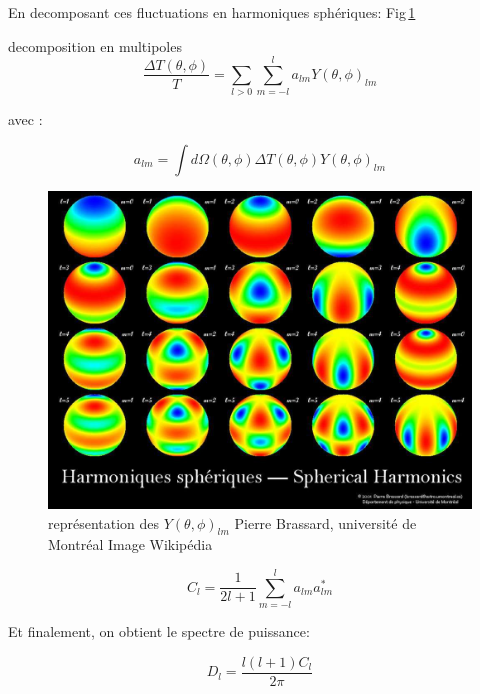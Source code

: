 En decomposant ces fluctuations en harmoniques sphériques:
Fig\,\ref{fig:harmoniques_spheriques}

decomposition en multipoles
\begin{equation}
 \frac{\Delta T(\theta,\phi)}{T} = \sum_{l>0} \sum_{m=-l}^l a_{lm} Y(\theta,\phi)_{lm}
\end{equation}

avec : 

\begin{equation}
a_{lm}= \int d\Omega(\theta,\phi) \Delta T (\theta,\phi) Y(\theta,\phi)_{lm}
\end{equation}

\begin{figure}[bth]
        \includegraphics[width=.95\linewidth]{img/01/harmoniques_spheriques.jpeg} 
        \caption{
        représentation des $Y(\theta,\phi)_{lm}$
 Pierre Brassard, université de Montréal 
        Image Wikipédia}
 		\label{fig:harmoniques_spheriques}
\end{figure}


\begin{equation}
C_l = \frac{1}{2l+1} \sum_{m=-l}^l a_{lm} a_{lm}^*
\end{equation}


Et finalement, on obtient le spectre de puissance:

\begin{equation}
D_l = \frac{l (l+1) C_l }{2 \pi} 
\end{equation}

